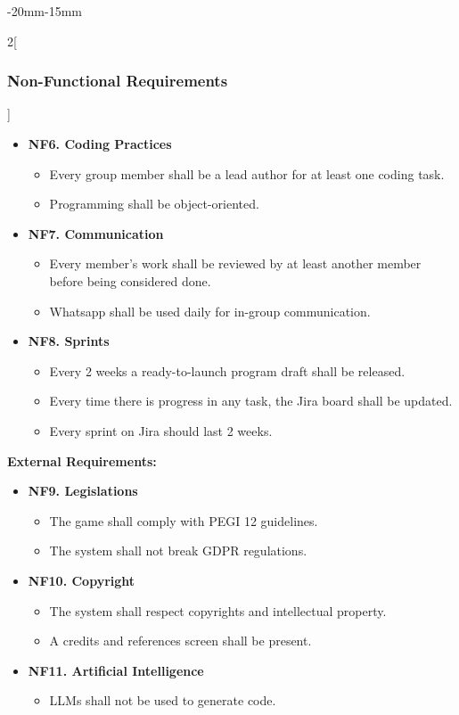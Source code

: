 \documentclass[12pt]{article}
\begin{document}
\begin{adjustwidth}{-20mm}{-15mm}
\begin{multicols}{2}[\subsubsection{Non-Functional Requirements}]
\begin{itemize}[leftmargin=*]
\item \textbf{NF6. Coding Practices}
\begin{itemize}[leftmargin=*]
\item Every group member shall be a lead author for at least one coding task.
\item Programming shall be object-oriented.
\end{itemize}

\item \textbf{NF7. Communication}
\begin{itemize}[leftmargin=*]
\item Every member’s work shall be reviewed by at least another member before being considered done.
\item Whatsapp shall be used daily for in-group communication.
\end{itemize}

\item \textbf{NF8. Sprints}
\begin{itemize}[leftmargin=*]
\item Every 2 weeks a ready-to-launch program draft shall be released.
\item Every time there is progress in any task, the Jira board shall be updated.
\item Every sprint on Jira should last 2 weeks.
\end{itemize}
\end{itemize}

\vspace{6pt}
\noindent\textbf{External Requirements:}
\begin{itemize}[leftmargin=*]
\item \textbf{NF9. Legislations}
\begin{itemize}[leftmargin=*]
\item The game shall comply with PEGI 12 guidelines.
\item The system shall not break GDPR regulations.
\end{itemize}

\item \textbf{NF10. Copyright}
\begin{itemize}[leftmargin=*]
\item The system shall respect copyrights and intellectual property.
\item A credits and references screen shall be present.
\end{itemize}

\item \textbf{NF11. Artificial Intelligence}
\begin{itemize}[leftmargin=*]
\item LLMs shall not be used to generate code.
\end{itemize}
\end{itemize}

\end{multicols}
\end{adjustwidth}
\end{document}

